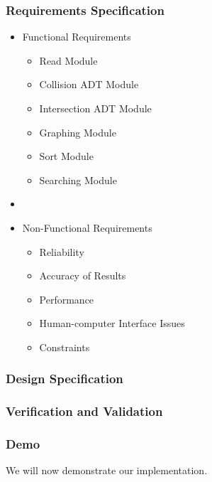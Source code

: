 \documentclass[t,12pt,numbers,fleqn]{beamer}
\begin{document}
\begin{frame}
\frametitle{Requirements Specification}
\begin{itemize}
    \item Functional Requirements
    \begin{itemize}
        \item Read Module
        \item Collision ADT Module
        \item Intersection ADT Module
        \item Graphing Module
        \item Sort Module
        \item Searching Module
    \end{itemize}
    \item[] %
    \item Non-Functional Requirements
    \begin{itemize}
        \item Reliability
        \item Accuracy of Results
        \item Performance
        \item Human-computer Interface Issues
        \item Constraints
    \end{itemize}
\end{itemize}
\end{frame}
\begin{frame}
\frametitle{Design Specification}
    
\end{frame}
\begin{frame}
\frametitle{Verification and Validation}

\end{frame}
\begin{frame}
\frametitle{Demo}
We will now demonstrate our implementation.
\end{frame}
\end{document}
